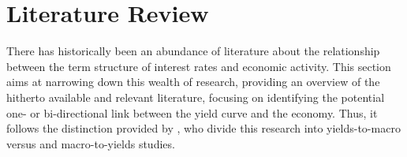 \section{Literature Review}
\label{sec:lit_rev}

There has historically been an abundance of literature about the relationship between the term structure of interest rates and economic activity. 
This section aims at narrowing down this wealth of research, providing an overview of the hitherto available and relevant literature, focusing on identifying the potential one- or bi-directional link between the yield curve and the economy. Thus, it follows the distinction provided by \citet{diebold2006macroeconomy}, who divide this research into yields-to-macro versus and macro-to-yields studies. 




